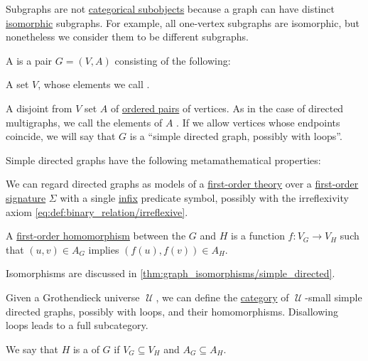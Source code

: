 \begin{remark}\label{rem:subgraphs_and_subobjects}
  Subgraphs are not \hyperref[def:subobject_and_quotient]{categorical subobjects} because a graph can have distinct \hyperref[thm:graph_isomorphisms]{isomorphic} subgraphs. For example, all one-vertex subgraphs are isomorphic, but nonetheless we consider them to be different subgraphs.
\end{remark}

\begin{definition}\label{def:directed_graph}
  A  is a pair \( G = (V, A) \) consisting of the following:
  \begin{thmenum}[series=def:directed_graph]
     A set \( V \), whose elements we call .

     A disjoint from \( V \) set \( A \) of \hyperref[def:ordered_tuple]{ordered pairs} of  vertices. As in the case of directed multigraphs, we call the elements of \( A \) . If we allow vertices whose endpoints coincide, we will say that \( G \) is a \enquote{simple directed graph, possibly with loops}.
  \end{thmenum}

  Simple directed graphs have the following metamathematical properties:
  \begin{thmenum}[resume=def:directed_graph]
    \mimprovised We can regard directed graphs as models of a \hyperref[def:first_order_theory]{first-order theory} over a \hyperref[def:first_order_signature]{first-order signature} \( \Sigma \) with a single \hyperref[rem:first_order_formula_conventions/infix]{infix} predicate symbol, possibly with the irreflexivity axiom \eqref{eq:def:binary_relation/irreflexive}.

    \mimprovised A \hyperref[def:first_order_homomorphism]{first-order homomorphism} between the \( G \) and \( H \) is a function \( f: V_G \to V_H \) such that \( (u, v) \in A_G \) implies \( (f(u), f(v)) \in A_H \).

    Isomorphisms are discussed in \cref{thm:graph_isomorphisms/simple_directed}.

    \mimprovised Given a Grothendieck universe \( \mscrU \), we can define the \hyperref[def:category]{category} of \( \mscrU \)-small simple directed graphs, possibly with loops, and their homomorphisms. Disallowing loops leads to a full subcategory.

    \mimprovised We say that \( H \) is a  of \( G \) if \( V_G \subseteq V_H \) and \( A_G \subseteq A_H \).
  \end{thmenum}
\end{definition}
